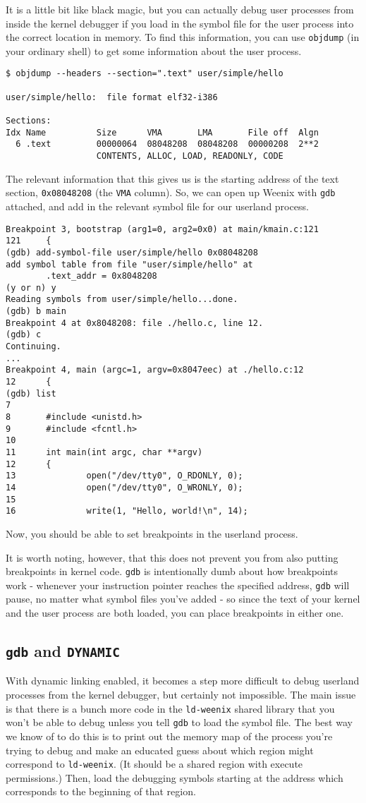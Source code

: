 It is a little bit like black magic, but you can actually debug user processes from inside the kernel debugger if you load in the symbol file for the user process into the correct location in memory. To find this information, you can use \texttt{objdump} (in your ordinary shell) to get some information about the user process.
\begin{verbatim}
$ objdump --headers --section=".text" user/simple/hello

user/simple/hello:  file format elf32-i386

Sections:
Idx Name          Size      VMA       LMA       File off  Algn
  6 .text         00000064  08048208  08048208  00000208  2**2
                  CONTENTS, ALLOC, LOAD, READONLY, CODE\end{verbatim}
The relevant information that this gives us is the starting address of the text section, \texttt{0x08048208} (the \texttt{VMA} column). So, we can open up Weenix with \texttt{gdb} attached, and add in the relevant symbol file for our userland process.
\begin{verbatim}
Breakpoint 3, bootstrap (arg1=0, arg2=0x0) at main/kmain.c:121
121     {
(gdb) add-symbol-file user/simple/hello 0x08048208
add symbol table from file "user/simple/hello" at
        .text_addr = 0x8048208
(y or n) y
Reading symbols from user/simple/hello...done.
(gdb) b main
Breakpoint 4 at 0x8048208: file ./hello.c, line 12.
(gdb) c
Continuing.
...
Breakpoint 4, main (argc=1, argv=0x8047eec) at ./hello.c:12
12      {
(gdb) list
7
8       #include <unistd.h>
9       #include <fcntl.h>
10
11      int main(int argc, char **argv)
12      {
13              open("/dev/tty0", O_RDONLY, 0);
14              open("/dev/tty0", O_WRONLY, 0);
15
16              write(1, "Hello, world!\n", 14);\end{verbatim}
Now, you should be able to set breakpoints in the userland process.

It is worth noting, however, that this does not prevent you from also putting breakpoints in kernel code. \texttt{gdb} is intentionally dumb about how breakpoints work - whenever your instruction pointer reaches the specified address, \texttt{gdb} will pause, no matter what symbol files you've added - so since the text of your kernel and the user process are both loaded, you can place breakpoints in either one.

\subsection{\texttt{gdb} and \texttt{DYNAMIC}}

With dynamic linking enabled, it becomes a step more difficult to debug userland processes from the kernel debugger, but certainly not impossible. The main issue is that there is a bunch more code in the \texttt{ld-weenix} shared library that you won't be able to debug unless you tell \texttt{gdb} to load the symbol file. The best way we know of to do this is to print out the memory map of the process you're trying to debug and make an educated guess about which region might correspond to \texttt{ld-weenix}. (It should be a shared region with execute permissions.) Then, load the debugging symbols starting at the address which corresponds to the beginning of that region.
